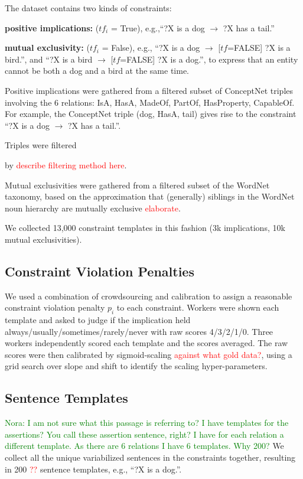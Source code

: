 \documentclass[11pt]{article}
\newcommand{\nk}[1]{\textcolor{green}{Nora: #1}}
\newcommand{\red}[1]{\textcolor{red}{#1}}
\newenvironment{des}{                 %
     \parskip 0cm \begin{list}{}{\parsep 0cm \itemsep 0cm \topsep 0cm}}{
       \end{list}} %
\begin{document}
\noindent
The dataset contains two kinds of constraints:
\begin{des}
\item[{\bf positive implications:}] ($tf_i$ = True), e.g.,``?X is a dog $\rightarrow$ ?X has a tail.''
\item[{\bf mutual exclusivity:}] ($tf_i$ = False), e.g.,
``?X is a dog $\rightarrow$ [$tf$=FALSE] ?X is a bird.'',
and ``?X is a bird $\rightarrow$ [$tf$=FALSE] ?X is a dog.'', to
express that an entity cannot be both a dog and a bird at the same time.

\end{des}
Positive implications were gathered from a filtered subset of ConceptNet triples involving the 6 relations: IsA, HasA, MadeOf, PartOf, HasProperty, CapableOf. For example, the ConceptNet triple (dog, HasA, tail) gives rise to the constraint ``?X is a dog $\rightarrow$ ?X has a tail.''. 

Triples were filtered

by \red{describe filtering method here}.

Mutual exclusivities were gathered from a filtered subset of the WordNet taxonomy,
based on the approximation that (generally) siblings in the WordNet noun hierarchy
are mutually exclusive \red{elaborate}.

We collected 13,000 constraint templates in this fashion (3k implications, 10k mutual
exclusivities).

\subsection{Constraint Violation Penalties}

We used a combination of crowdsourcing and calibration to assign a reasonable
constraint violation penalty $p_i$ to each constraint. Workers were shown each
template and asked to judge if the implication held always/usually/sometimes/rarely/never with raw scores 4/3/2/1/0.
Three workers independently scored each template and the scores averaged.
The raw scores were then calibrated by sigmoid-scaling \red{against what gold data?}, using a
grid search over slope and shift to identify the scaling hyper-parameters.

\subsection{Sentence Templates}
\nk{I am not sure what this passage is referring to? I have templates for the assertions? You call these assertion sentence, right? I have for each relation a different template. As there are 6 relations I have 6 templates. Why 200?}
We collect all the unique variabilized sentences in the constraints together,
resulting in 200 \red{??} sentence templates, e.g., ``?X is a dog.''.
\end{document}
